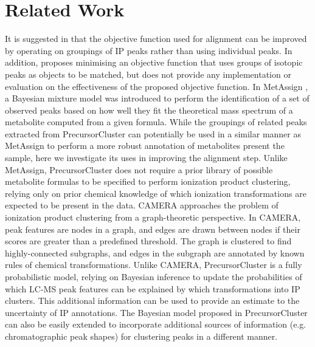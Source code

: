 \section{Related Work}

It is suggested in \cite{Smith2013} that the objective function used for alignment can be improved by operating on groupings of IP peaks rather than using individual peaks. In addition, \cite{Smith2015} proposes minimising an objective function that uses groups of isotopic peaks as objects to be matched, but does not provide any implementation or evaluation on the effectiveness of the proposed objective function. In MetAssign \cite{Daly2014}, a Bayesian mixture model was introduced to perform the identification of a set of observed peaks based on how well they fit the theoretical mass spectrum of a metabolite computed from a given formula. While the groupings of related peaks extracted from PrecursorCluster can potentially be used in a similar manner as MetAssign to perform a more robust annotation of metabolites present the sample, here we investigate its uses in improving the alignment step. Unlike MetAssign, PrecursorCluster does not require a prior library of possible metabolite formulas to be specified to perform ionization product clustering, relying only on prior chemical knowledge of which ionization transformations are expected to be present in the data. CAMERA \cite{Kuhl2012} approaches the problem of ionization product clustering from a graph-theoretic perspective. In CAMERA, peak features are nodes in a graph, and edges are drawn between nodes if their scores are greater than a predefined threshold. The graph is clustered to find highly-connected subgraphs, and edges in the subgraph are annotated by known rules of chemical transformations. Unlike CAMERA, PrecursorCluster is a fully probabilistic model, relying on Bayesian inference to update the probabilities of which LC-MS peak features can be explained by which transformations into IP clusters. This additional information can be used to provide an estimate to the uncertainty of IP annotations. The Bayesian model proposed in PrecursorCluster can also be easily extended to incorporate additional sources of information (e.g. chromatographic peak shapes) for clustering peaks in a different manner. 

